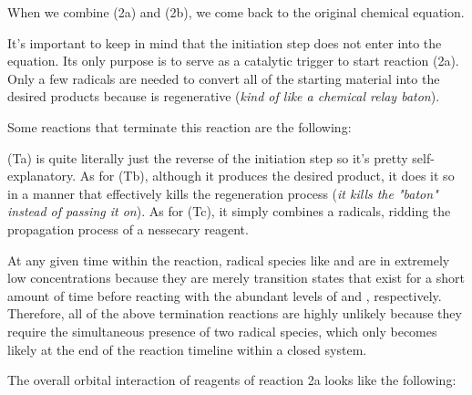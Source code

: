 \documentclass[10pt]{article}
\begin{document}
  

  When we combine (2a) and (2b), we come back to the original chemical equation.


  It's important to keep in mind that the initiation step does not enter into the equation. Its only purpose is to serve as a catalytic trigger to start reaction (2a). Only a few  radicals are needed to convert all of the starting material into the desired products because  is regenerative (\textit{kind of like a chemical relay baton}). 

  Some reactions that terminate this reaction are the following:

  
  

  (Ta) is quite literally just the reverse of the initiation step so it's pretty self-explanatory. As for (Tb), although it produces the desired product, it does it so in a manner that effectively kills the  regeneration process (\textit{it kills the "baton" instead of passing it on}). As for (Tc), it simply combines a  radicals, ridding the propagation process of a nessecary reagent. 

  At any given time within the reaction, radical species like  and  are in extremely low concentrations because they are merely transition states that exist for a short amount of time before reacting with the abundant levels of  and , respectively. Therefore, all of the above termination reactions are highly unlikely because they require the simultaneous presence of two radical species, which only becomes likely at the end of the reaction timeline within a closed system.

  The overall orbital interaction of reagents of reaction 2a looks like the following:

\end{document}
